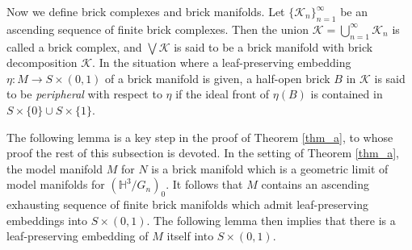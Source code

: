 \documentclass{amsart}
\theoremstyle{definition}
\numberwithin{figure}{section}
\numberwithin{equation}{section}
\newcommand{\blackboard}[1]{\ensuremath{\mathbb{#1}}}
\newcommand{\hyperbolic}{\blackboard{H}}
\def\hh{\hyperbolic}
\def\ck{\mathcal{K}}
\def\eset{\emptyset}
\def\part{\partial}
\def\Int{\mathrm{Int}}
\begin{document}
 

Now we define brick complexes and brick manifolds.
Let $\{\ck_n\}_{n=1}^\infty$ be an ascending sequence of finite brick complexes.
Then the union $ \ck=\bigcup_{n=1}^\infty  \ck_n$ is called a  brick complex, and 
$\bigvee \ck$ is said to be a  brick manifold with  brick decomposition $\ck$.
In the situation where a leaf-preserving embedding $\eta:M\rightarrow S\times (0,1)$ of a brick manifold is given, a half-open brick $B$ in $\ck$ is  said to be
\emph{peripheral} with respect to $\eta$ if the ideal front of $\eta(B)$ is contained in 
$S\times \{0\}\cup S\times \{1\}$.

  
The following lemma is a key step in the proof of Theorem \ref{thm_a}, to whose proof the rest of this subsection is devoted.
In the setting of Theorem \ref{thm_a}, the model manifold $M$ for $N$ is a brick manifold which is a geometric limit of model manifolds for $(\hh^3/G_n)_0$.
It follows that $M$ contains an ascending exhausting sequence of finite brick manifolds which admit leaf-preserving embeddings into $S \times (0,1)$.
The following lemma then implies that there is a leaf-preserving embedding of $M$ itself into $S \times (0,1)$.
\end{document}
